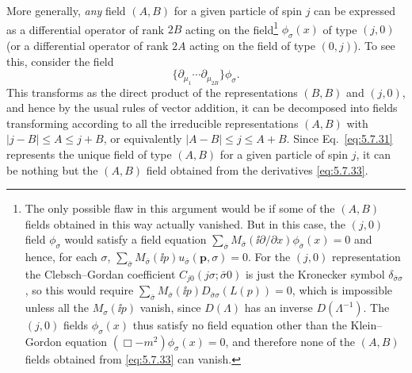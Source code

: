 More generally, \emph{any} field $(A,B)$ for a given particle of spin $j$ can
be expressed as a differential operator of rank $2B$ acting on the
field\footnote{The only possible flaw in this argument would be if some of the
$(A,B)$ fields obtained in this way actually vanished. But in this case, the
$(j,0)$ field $\phi_\sigma$ would satisfy a field equation
$\sum_{\bar\sigma}M_{\bar\sigma}(\ii\partial/\partial x)
\phi_{\bar\sigma}(x)=0$ and hence, for each $\sigma$,
$\sum_{\bar\sigma}M_{\bar\sigma}(\ii p)u_{\bar\sigma}(\mathbf p,\sigma)=0$.
For the
$(j,0)$ representation the Clebsch--Gordan coefficient
$C_{j0}(j\sigma;\bar\sigma0)$ is just the Kronecker symbol
$\delta_{\bar\sigma\sigma}$, so this would require
$\sum_{\bar\sigma}M_{\bar\sigma}(\ii p)D_{\bar\sigma\sigma}(L(p))=0$,
which is impossible unless all the $M_\sigma(\ii p)$ vanish, since $D(\Lambda)$
has an inverse $D(\Lambda^{-1})$. The $(j,0)$ fields $\phi_\sigma(x)$ thus
satisfy no field equation other than the Klein--Gordon equation
$(\Box-m^2)\phi_\sigma(x)=0$, and therefore none of the $(A,B)$ fields obtained
from \eqref{eq:5.7.33} can vanish.} $\phi_\sigma(x)$ of type $(j,0)$ (or a differential
operator of rank $2A$ acting on the field of type $(0,j)$). To see this,
consider the field
\begin{equation}
\{\partial_{\mu_1}\cdots\partial_{\mu_{2B}}\}\phi_\sigma.
\tag{5.7.33}\label{eq:5.7.33}
\end{equation}
This transforms as the direct product of the representations $(B,B)$ and
$(j,0)$, and hence by the usual rules of vector addition, it can be decomposed
into fields transforming according to all the irreducible representations
$(A,B)$ with $|j-B|\leq A\leq j+B$, or equivalently
$|A-B|\leq j\leq A+B$. Since Eq.~\eqref{eq:5.7.31} represents the unique field of type
$(A,B)$ for a given particle of spin $j$, it can be nothing but the $(A,B)$
field obtained from the derivatives \eqref{eq:5.7.33}.

